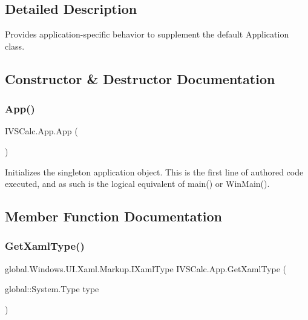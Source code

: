 \subsection{Detailed Description}
Provides application-\/specific behavior to supplement the default Application class. 



\subsection{Constructor \& Destructor Documentation}
\mbox{\label{class_i_v_s_calc_1_1_app_a194ca166fa888243dbe889079be6da7d}} 
\subsubsection{\texorpdfstring{App()}{App()}}
{\footnotesize\ttfamily I\+V\+S\+Calc.\+App.\+App (\begin{DoxyParamCaption}{ }\end{DoxyParamCaption})}



Initializes the singleton application object. This is the first line of authored code executed, and as such is the logical equivalent of main() or Win\+Main(). 



\subsection{Member Function Documentation}
\mbox{\label{class_i_v_s_calc_1_1_app_aef34fbc14d2a7b2c647dd5e7b8252cb8}} 
\subsubsection{\texorpdfstring{Get\+Xaml\+Type()}{GetXamlType()}\hspace{0.1cm}{\footnotesize\ttfamily [1/10]}}
{\footnotesize\ttfamily global.\+Windows.\+U\+I.\+Xaml.\+Markup.\+I\+Xaml\+Type I\+V\+S\+Calc.\+App.\+Get\+Xaml\+Type (\begin{DoxyParamCaption}\item[{global\+::\+System.\+Type}]{type }\end{DoxyParamCaption})}



